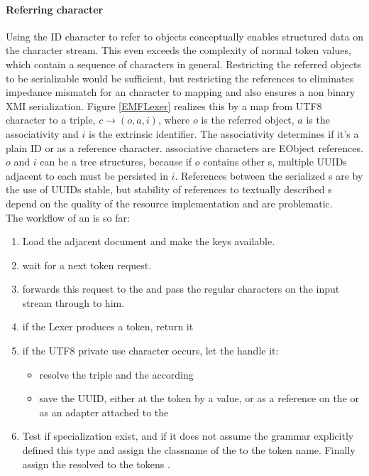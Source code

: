 \paragraph{Referring character} \label{lexer:RefEObj} Using the ID character to refer to objects conceptually enables structured data on the character stream. This even exceeds the complexity of normal token values, which contain a sequence of characters in general. Restricting the referred objects to be serializable would be sufficient, but restricting the references to  eliminates impedance mismatch for an character to  mapping and also ensures a non binary XMI serialization. Figure \ref{EMFLexer} realizes this by a map from UTF8 character to a triple, $c \rightarrow (o,a,i)$, where $o$ is the referred object, $a$ is the associativity and $i$ is the extrinsic identifier. The associativity determines if it's a plain ID or as a reference character.  associative characters are EObject references. $o$ and $i$ can be a tree structures, because if $o$ contains other s, multiple UUIDs adjacent to each  must be persisted in $i$. References between the serialized s are by the use of UUIDs stable, but stability of references to textually described s depend on the quality of the resource implementation and are problematic. \\
The workflow of an  is so far:
\begin{enumerate}
	\item Load the adjacent document and make the keys available.
	\item wait for a next token request.
	\item forwards this request to the  and pass the regular characters on the input stream through to him.
	\item if the Lexer produces a token, return it
	\item if the UTF8 private use character occurs, let the  handle it:
		\begin{itemize}
			\item resolve the triple and the according 
			\item save the UUID, either at the token by a value, or as a reference on the  or as an adapter attached to the  
		\end{itemize} 
	\item Test if specialization  exist, and if it does not assume the grammar explicitly defined this type and assign the classname of the  to the token name. Finally assign the resolved  to the tokens .
\end{enumerate}

